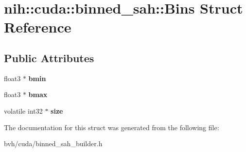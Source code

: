 \hypertarget{structnih_1_1cuda_1_1binned__sah_1_1_bins}{
\section{nih\-:\-:cuda\-:\-:binned\-\_\-sah\-:\-:\-Bins \-Struct \-Reference}
\label{structnih_1_1cuda_1_1binned__sah_1_1_bins}
}
\subsection*{\-Public \-Attributes}
\begin{DoxyCompactItemize}
\item 
\hypertarget{structnih_1_1cuda_1_1binned__sah_1_1_bins_af7889584471558c956563c5730f164c3}{
float3 $\ast$ {\bfseries bmin}}
\label{structnih_1_1cuda_1_1binned__sah_1_1_bins_af7889584471558c956563c5730f164c3}

\item 
\hypertarget{structnih_1_1cuda_1_1binned__sah_1_1_bins_a5c137083661b5ccbbe2d9be2a2ebeec1}{
float3 $\ast$ {\bfseries bmax}}
\label{structnih_1_1cuda_1_1binned__sah_1_1_bins_a5c137083661b5ccbbe2d9be2a2ebeec1}

\item 
\hypertarget{structnih_1_1cuda_1_1binned__sah_1_1_bins_a3bd6e9ce57e1b2020a1a342a4a49112b}{
volatile int32 $\ast$ {\bfseries size}}
\label{structnih_1_1cuda_1_1binned__sah_1_1_bins_a3bd6e9ce57e1b2020a1a342a4a49112b}

\end{DoxyCompactItemize}


\-The documentation for this struct was generated from the following file\-:\begin{DoxyCompactItemize}
\item 
bvh/cuda/binned\-\_\-sah\-\_\-builder.\-h\end{DoxyCompactItemize}

